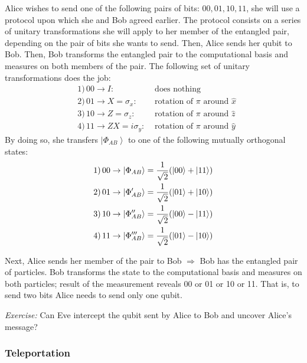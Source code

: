\documentclass[12pt]{article}
\newcommand{\be}{\begin{equation}}
\newcommand{\ee}{\end{equation}}
\begin{document}
Alice wishes to send one of the following pairs
of bits: \(00,01,10,11\), she will use a protocol
upon which she and Bob agreed earlier.
The protocol consists on a series of unitary
transformations she will apply to her member
of the entangled pair, depending on the
pair of bits she wants to send. Then, Alice
sends her qubit to Bob. Then, Bob transforms
the entangled pair to the computational
basis and measures on both members of the pair.
The following set of unitary transformations
does the job:
\be
\begin{aligned}
&1)\,00 \rightarrow I:               &\text{ does nothing}\\
&2)\,01 \rightarrow X =\sigma_{x}:   &\text { rotation of } \pi \text { around } \hat{x}\\
&3)\,10 \rightarrow Z =\sigma_{z}:   &\text { rotation of } \pi \text { around } \hat{z}\\
&4)\,11 \rightarrow ZX =i\sigma_{y}: &\text { rotation of } \pi \text { around } \hat{y} 
\end{aligned}
\ee
By doing so, she transfers \(\left|\Phi_{A B}\right\rangle\) to one of
the following mutually orthogonal states:
\[
\begin{aligned}
1)\,00 \to \ket{\Phi_{AB}}                      &= \frac{1}{\sqrt 2}(\ket{00}+\ket{11})\\
2)\,01 \to \ket{\Phi_{AB}^\prime}               &= \frac{1}{\sqrt 2}(\ket{01}+\ket{10})\\
3)\,10 \to \ket{\Phi_{AB}^{\prime\prime}}       &= \frac{1}{\sqrt 2}(\ket{00}-\ket{11})\\
4)\,11 \to \ket{\Phi_{AB}^{\prime\prime\prime}} &= \frac{1}{\sqrt 2}(\ket{01}-\ket{10})\\
\end{aligned}
\]


Next, Alice sends her member of the pair
to Bob \(\Rightarrow\) Bob has the entangled pair
of particles.
Bob transforms the state to the computational
basis and measures on both particles;
result of the measurement reveals
00 or 01 or 10 or 11.
That is, to send two bits Alice needs
to send only one qubit.

\emph{Exercise:} Can Eve intercept the qubit sent by
Alice to Bob and uncover Alice's message?

\subsubsection{Teleportation}
\end{document}
